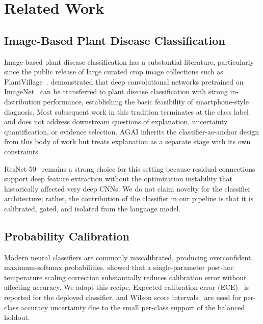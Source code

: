 \section{Related Work}

\subsection{Image-Based Plant Disease Classification}

Image-based plant disease classification has a substantial literature,
particularly since the public release of large curated crop image
collections such as PlantVillage~\citep{hughes2015plantvillage}.
\citet{mohanty2016plantdisease} demonstrated that deep convolutional
networks pretrained on ImageNet~\citep{russakovsky2015imagenet} can be
transferred to plant disease classification with strong in-distribution
performance, establishing the basic feasibility of smartphone-style
diagnosis. Most subsequent work in this tradition terminates at the class
label and does not address downstream questions of explanation,
uncertainty quantification, or evidence selection. AGAI inherits the
classifier-as-anchor design from this body of work but treats explanation
as a separate stage with its own constraints.

ResNet-50~\citep{he2016resnet} remains a strong choice for this setting
because residual connections support deep feature extraction without the
optimization instability that historically affected very deep CNNs. We do
not claim novelty for the classifier architecture; rather, the contribution
of the classifier in our pipeline is that it is calibrated, gated, and
isolated from the language model.

\subsection{Probability Calibration}

Modern neural classifiers are commonly miscalibrated, producing
overconfident maximum-softmax probabilities. \citet{guo2017calibration}
showed that a single-parameter post-hoc temperature scaling correction
substantially reduces calibration error without affecting accuracy. We
adopt this recipe. Expected calibration error
(ECE)~\citep{naeini2015ece} is reported for the deployed classifier, and
Wilson score intervals~\citep{wilson1927interval} are used for per-class
accuracy uncertainty due to the small per-class support of the balanced
holdout.

